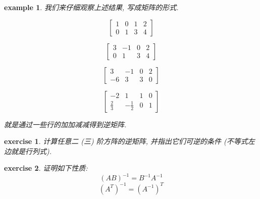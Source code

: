 \documentclass{ctexart}
\newtheorem{exercise}{exercise}
\newtheorem{example}{example}
\begin{document}
\begin{example}
        我们来仔细观察上述结果, 写成矩阵的形式.
        
        \begin{equation}
            \begin{bmatrix}
                1 & 0 & 1 & 2 \\
                0 & 1 & 3 & 4
            \end{bmatrix}
        \end{equation}

        \begin{equation}
            \begin{bmatrix}
                3 & -1 & 0 & 2 \\
                0 & 1 & 3 & 4
            \end{bmatrix}
        \end{equation}


        \begin{equation}
            \begin{bmatrix}
                3 & -1 & 0 & 2 \\
                -6 & 3 & 3 & 0
            \end{bmatrix}
        \end{equation}


        \begin{equation}
            \begin{bmatrix}
                -2 & 1 & 1 & 0 \\
                \frac{2}{3} &-\frac{1}{2} & 0 & 1
            \end{bmatrix}
        \end{equation}

        就是通过一些行的加加减减得到逆矩阵.
    \end{example}
    
    \begin{exercise}
        计算任意二 (三) 阶方阵的逆矩阵, 并指出它们可逆的条件 (不等式左边就是行列式).
    \end{exercise}

    \begin{exercise}
        证明如下性质:
        \begin{equation}
            {(AB)}^{-1} = B^{-1}A^{-1}
        \end{equation}
        \begin{equation}
            {(A^T)}^{-1} = {(A^{-1})}^T
        \end{equation}
    \end{exercise}
\end{document}
